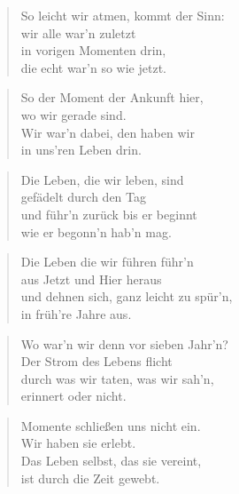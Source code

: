 \documentclass[10pt,a4paper]{article}
\begin{document}
\begin{paracol}{2}
\begin{verse}
So leicht wir atmen, kommt der Sinn: \\
wir alle war’n zuletzt \\
in vorigen Momenten drin, \\
die echt war’n so wie jetzt. \\
\end{verse}

\begin{verse}
So der Moment der Ankunft hier, \\
wo wir gerade sind. \\
Wir war’n dabei, den haben wir \\
in uns’ren Leben drin. \\
\end{verse}

\begin{verse}
Die Leben, die wir leben, sind \\
gefädelt durch den Tag \\
und führ’n zurück bis er beginnt \\
wie er begonn’n hab’n mag. \\
\end{verse}

\begin{verse}
Die Leben die wir führen führ’n \\
aus Jetzt und Hier heraus \\
und dehnen sich, ganz leicht zu spür’n, \\
in früh’re Jahre aus. \\
\end{verse}

\begin{verse}
Wo war’n wir denn vor sieben Jahr’n? \\
Der Strom des Lebens flicht \\
durch was wir taten, was wir sah’n, \\
erinnert oder nicht. \\
\end{verse}

\begin{verse}
Momente schließen uns nicht ein. \\
Wir haben sie erlebt. \\
Das Leben selbst, das sie vereint, \\
ist durch die Zeit gewebt. \\
\end{verse}


\end{paracol}
\end{document}
